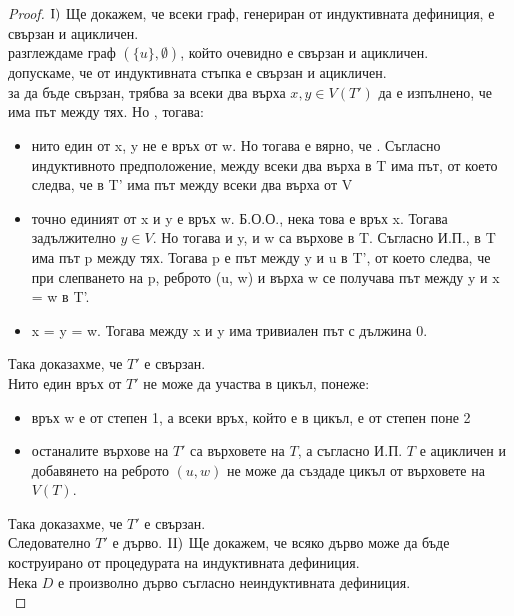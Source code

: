 \begin{proof}
    \(\newline\text{I)}\) Ще докажем, че всеки граф, генериран от индуктивната дефиниция, е свързан и 
    ацикличен. \\
     разглеждаме граф \((\{u\}, \emptyset)\), който очевидно е свързан и ацикличен. \\
     допускаме, че  от индуктивната стъпка е свързан и ацикличен. \\
     за да бъде свързан, трябва за всеки два върха \(x, y \in V(T')\) да е изпълнено, че
    има път между тях. Но , тогава:
    \begin{itemize}
        \item нито един от x, y не е връх от w. Но тогава е вярно, че . Съгласно 
        индуктивното предположение, между всеки два върха в T има път, от което следва, че в T' има път 
        между всеки два върха от V
        \item точно единият от x и y е връх w. Б.О.О., нека това е връх x. Тогава задължително \(y \in V\).
        Но тогава и y, и w са върхове в T. Съгласно И.П., в T има път p между тях. Тогава p е път между y и 
        u в T', от което следва, че при слепването на p, реброто (u, w) и върха w се получава път между y и
        x = w в T'.
        \item x = y = w. Тогава между x и y има тривиален път с дължина 0. 
    \end{itemize}
    Така доказахме, че \(T'\) е свързан. \\
    Нито един връх от \(T'\) не може да участва в цикъл, понеже:
    \begin{itemize}
        \item връх w е от степен 1, а всеки връх, който е в цикъл, е от степен поне 2
        \item останалите върхове на \(T'\) са върховете на \(T\), а съгласно И.П. \(T\) е ацикличен и добавянето на 
        реброто \((u, w)\) не може да създаде цикъл от върховете на \(V(T)\).
    \end{itemize}
    Така доказахме, че \(T'\) е свързан. \\
    Следователно \(T'\) е дърво.
    \(\newline\text{II)}\) Ще докажем, че всяко дърво може да бъде коструирано от процедурата на 
    индуктивната дефиниция. \\
    Нека \(D\) е произволно дърво съгласно неиндуктивната дефиниция. \\

\end{proof}
